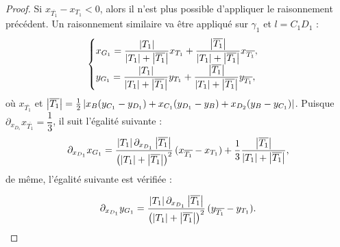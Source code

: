 \documentclass[12pt,a4paper]{article}
\begin{document}
\begin{proof}
		Si $x_{\overline{T_1}}-x_{T_1} < 0$, alors il n'est plus possible d'appliquer le raisonnement précédent. Un raisonnement similaire va être appliqué sur $\gamma_1$ et $l = C_1D_1$ :
		\[
			\begin{cases}
				x_{G_1} = \dfrac{\left\lvert T_1 \right\rvert}{\left\lvert T_1 \right\rvert+\left\lvert \overline{T_1} \right\rvert}x_{T_1}+ \dfrac{\left\lvert \overline{T_1} \right\rvert}{\left\lvert T_1 \right\rvert+\left\lvert \overline{T_1} \right\rvert}x_{\overline{T_1}},\\
				y_{G_1} = \dfrac{\left\lvert T_1 \right\rvert}{\left\lvert T_1 \right\rvert+\left\lvert \overline{T_1} \right\rvert}y_{T_1}+ \dfrac{\left\lvert \overline{T_1} \right\rvert}{\left\lvert T_1 \right\rvert+\left\lvert \overline{T_1} \right\rvert}y_{\overline{T_1}},
			\end{cases}
		\]
		où $x_{\overline{T_1}}$ et $\left\lvert \overline{T_1} \right\rvert = \frac12\left\lvert x_B(y_{C_1}-y_{D_1})+x_{C_1}(y_{D_1}-y_B)+x_{D_2}(y_B-y_{C_1}) \right\rvert$. Puisque $\partial_{x_{D_1}} x_{\overline{T_1}} = \dfrac13$, il suit l'égalité suivante :
		\begin{equation}\label{eq:xG}
			\partial_{x_{D_1}}x_{G_1}  = \dfrac{\left\lvert T_1 \right\rvert\partial_{x_{D_1}}\left\lvert \overline{T_1} \right\rvert}{\left(\left\lvert T_1 \right\rvert+\left\lvert \overline{T_1} \right\rvert\right)^2}\,(x_{\overline{T_1}}-x_{T_1}) +\dfrac13 \dfrac{\left\lvert \overline{T_1} \right\rvert}{\left\lvert T_1 \right\rvert+\left\lvert \overline{T_1} \right\rvert},
		\end{equation}
		de même, l'égalité suivante est vérifiée :
		
		\begin{equation}\label{eq:yG}
				\partial_{x_{D_1}}y_{G_1} = \dfrac{\left\lvert T_1 \right\rvert\partial_{x_{D_1}}\left\lvert \overline{T_1} \right\rvert}{\left(\left\lvert T_1 \right\rvert+\left\lvert \overline{T_1} \right\rvert\right)^2}\,(y_{\overline{T_1}}-y_{T_1}).
		\end{equation}
		

\end{proof}
\end{document}
